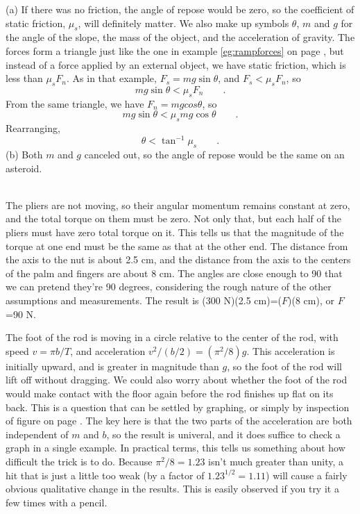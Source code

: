 (a) If there was no friction, the angle of repose would
be zero, so the coefficient of static friction, $\mu_s$, will
definitely matter. We also make up symbols $\theta$, $m$ and $g$ for
the angle of the slope, the mass of the object, and the
acceleration of gravity. The forces form a triangle just
like the one in example \ref{eg:rampforces}
 on page \pageref{eg:rampforces}, but instead of a force applied
by an external object, we have static friction, which is
less than $\mu_sF_n$. As in that example, $F_s=mg \sin \theta$, and
$F_s<\mu_s F_n$, so
\begin{equation*}
	mg \sin \theta<\mu_sF_n  \qquad .
\end{equation*}
From the same triangle, we have $F_n=mg cos \theta$, so
\begin{equation*}
	mg \sin \theta < \mu_s mg \cos \theta \qquad .
\end{equation*}
Rearranging,
\begin{equation*}
	\theta < \tan^{-1} \mu_s \qquad  .
\end{equation*}
(b) Both $m$ and $g$ canceled out, so the angle of repose would
be the same on an asteroid.

\noindent{}\\
The pliers are not moving, so their angular momentum remains
constant at zero, and the total torque on them must be zero.
Not only that, but each half of the pliers must have zero
total torque on it. This tells us that the magnitude of the
torque at one end must be the same as that at the other end.
The distance from the axis to the nut is about 2.5 cm, and
the distance from the axis to the centers of the palm and
fingers are about 8 cm. The angles are close enough to 90\degunit
that we can pretend they're 90 degrees, considering the
rough nature of the other assumptions and measurements. The
result is (300 N)(2.5 cm)=($F$)(8 cm), or $F$=90 N.

The foot of the rod is moving in a circle relative to the center of the rod,
with speed $v=\pi b/T$, and acceleration $v^2/(b/2)=(\pi^2/8)g$. This acceleration
is initially upward, and is greater in magnitude than $g$, so the foot of the rod
will lift off without dragging. We could also worry about whether the foot of the
rod would make contact with the floor again before the rod finishes up flat on its
back. This is a question that can be settled by graphing, or simply by inspection
of figure  on page \pageref{fig:eg-toppling-rod}. The key here
is that the two parts of the acceleration are both independent of $m$ and $b$, so
the result is univeral, and it does suffice to check a graph in a single example.
In practical terms, this tells us something about how difficult the trick is to
do. Because $\pi^2/8=1.23$ isn't much greater than unity, a hit that is just a
little too weak (by a factor of $1.23^{1/2}=1.11$) will cause
a fairly obvious qualitative change in the results. This is easily observed
if you try it a few times with a pencil.


